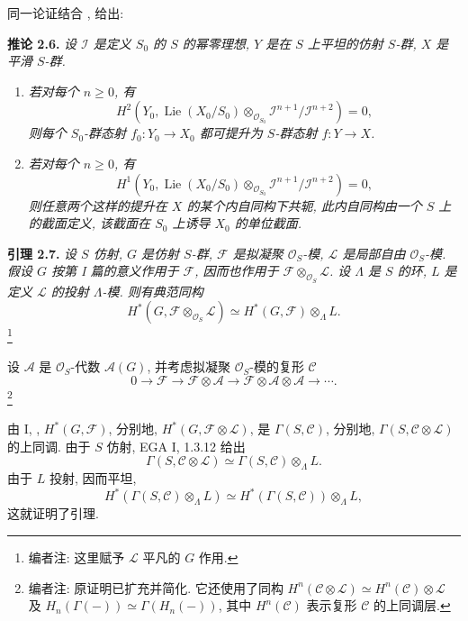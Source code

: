 同一论证结合 , 给出:

\medskip
\noindent{}\textbf{推论 2.6.}
\textit{设 \(\mathscr I\) 是定义 \(S_0\) 的 \(S\) 的幂零理想,
\(Y\) 是在 \(S\) 上平坦的仿射 \(S\)-群,
\(X\) 是平滑 \(S\)-群.}
\begin{enumerate}
\item[\(i\)] \textit{若对每个 \(n\geq0\), 有}
 \[
  H^2\!\left(Y_0,
   \operatorname{Lie}(X_0/S_0)\otimes_{\mathscr O_{S_0}}
   \mathscr I^{n+1}/\mathscr I^{n+2}\right)=0,
 \]
 \textit{则每个 \(S_0\)-群态射 \(f_0:Y_0\to X_0\)
 都可提升为 \(S\)-群态射 \(f:Y\to X\).}
\item[(ii)] \textit{若对每个 \(n\geq0\), 有}
 \[
  H^1\!\left(Y_0,
   \operatorname{Lie}(X_0/S_0)\otimes_{\mathscr O_{S_0}}
   \mathscr I^{n+1}/\mathscr I^{n+2}\right)=0,
 \]
 \textit{则任意两个这样的提升在 \(X\) 的某个内自同构下共轭,
 此内自同构由一个 \(S\) 上的截面定义,
 该截面在 \(S_0\) 上诱导 \(X_0\) 的单位截面.}
\end{enumerate}

\medskip
\noindent{}\textbf{引理 2.7.}
\textit{设 \(S\) 仿射, \(G\) 是仿射 \(S\)-群,
\(\mathscr F\) 是拟凝聚 \(\mathscr O_S\)-模,
\(\mathscr L\) 是局部自由 \(\mathscr O_S\)-模.
假设 \(G\) 按第 I 篇的意义作用于 \(\mathscr F\),
因而也作用于 \(\mathscr F\otimes_{\mathscr O_S}\mathscr L\).
设 \(\Lambda\) 是 \(S\) 的环, \(L\) 是定义
\(\mathscr L\) 的投射 \(\Lambda\)-模. 则有典范同构}
\[
 H^*(G,\mathscr F\otimes_{\mathscr O_S}\mathscr L)
 \simeq H^*(G,\mathscr F)\otimes_\Lambda L.
\]
\footnote{编者注: 这里赋予 \(\mathscr L\) 平凡的 \(G\) 作用.}

设 \(\mathscr A\) 是 \(\mathscr O_S\)-代数
\(\mathscr A(G)\), 并考虑拟凝聚 \(\mathscr O_S\)-模的复形 \(\mathscr C\)
\[
 0\longrightarrow\mathscr F
 \longrightarrow\mathscr F\otimes\mathscr A
 \longrightarrow\mathscr F\otimes\mathscr A\otimes\mathscr A
 \longrightarrow\cdots.
\]
\footnote{编者注: 原证明已扩充并简化. 它还使用了同构
 \(H^n(\mathscr C\otimes\mathscr L)\simeq
 H^n(\mathscr C)\otimes\mathscr L\) 及
\(H_n(\Gamma(-))\simeq\Gamma(H_n(-))\), 其中
\(H^n(\mathscr C)\) 表示复形 \(\mathscr C\) 的上同调层.}

由 I, ,
\(H^*(G,\mathscr F)\), 分别地,
\(H^*(G,\mathscr F\otimes\mathscr L)\), 是
\(\Gamma(S,\mathscr C)\), 分别地,
\(\Gamma(S,\mathscr C\otimes\mathscr L)\) 的上同调.
由于 \(S\) 仿射, EGA I, 1.3.12 给出
\[
 \Gamma(S,\mathscr C\otimes\mathscr L)
 \simeq\Gamma(S,\mathscr C)\otimes_\Lambda L.
\]
由于 \(L\) 投射, 因而平坦,
\[
 H^*(\Gamma(S,\mathscr C)\otimes_\Lambda L)
 \simeq H^*(\Gamma(S,\mathscr C))\otimes_\Lambda L,
\]
这就证明了引理.

